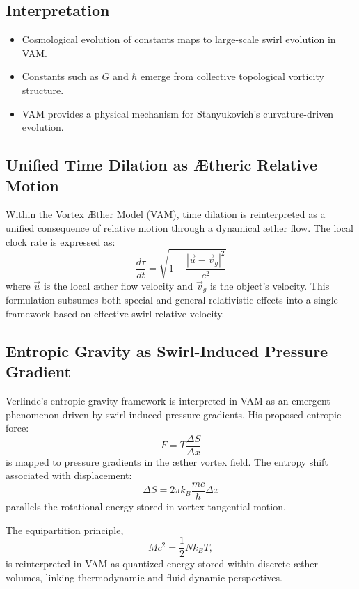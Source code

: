 \documentclass[11pt]{article}
\begin{document}
\subsection*{Interpretation}
\begin{itemize}
\item Cosmological evolution of constants maps to large-scale swirl evolution in VAM.
\item Constants such as $G$ and $\hbar$ emerge from collective topological vorticity structure.
\item VAM provides a physical mechanism for Stanyukovich’s curvature-driven evolution.
\end{itemize}



    \subsection*{Unified Time Dilation as Ætheric Relative Motion}

    Within the Vortex Æther Model (VAM), time dilation is reinterpreted as a unified consequence of relative motion through a dynamical æther flow. The local clock rate is expressed as:
    \[
        \frac{d\tau}{dt} = \sqrt{1 - \frac{|\vec{u} - \vec{v}_g|^2}{c^2}}
    \]
    where $\vec{u}$ is the local æther flow velocity and $\vec{v}_g$ is the object's velocity. This formulation subsumes both special and general relativistic effects into a single framework based on effective swirl-relative velocity.

    \subsection*{Entropic Gravity as Swirl-Induced Pressure Gradient}

    Verlinde's entropic gravity framework \cite{verlinde2010emergent} is interpreted in VAM as an emergent phenomenon driven by swirl-induced pressure gradients. His proposed entropic force:
    \[
        F = T \frac{\Delta S}{\Delta x}
    \]
    is mapped to pressure gradients in the æther vortex field. The entropy shift associated with displacement:
    \[
        \Delta S = 2\pi k_B \frac{mc}{\hbar} \Delta x
    \]
    parallels the rotational energy stored in vortex tangential motion.

    The equipartition principle,
    \[
        Mc^2 = \frac{1}{2} N k_B T,
    \]
    is reinterpreted in VAM as quantized energy stored within discrete æther volumes, linking thermodynamic and fluid dynamic perspectives.
\end{document}
